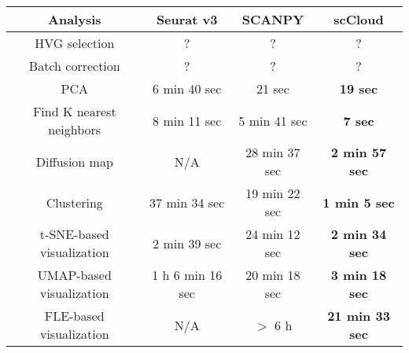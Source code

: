 \documentclass[10pt]{article}
\begin{document}
\begin{table}[H]
	\centering
	\begin{tabular}{|c|c|c|c|}
		\hline
		Analysis & Seurat v3 & SCANPY & scCloud\\
		\hline \hline
		HVG selection & ? & ? & ? \\
		\hline
		Batch correction & ? & ? & ? \\
		\hline
		PCA & 6 min 40 sec & 21 sec & \textbf{19 sec} \\
		\hline
		Find K nearest neighbors & 8 min 11 sec &  5 min 41 sec & \textbf{7 sec}\\
		\hline
		Diffusion map & N/A & 28 min 37 sec & \textbf{2 min 57 sec} \\
		\hline 
		Clustering & 37 min 34 sec & 19 min 22 sec & \textbf{1 min 5 sec}\\
		\hline
		t-SNE-based visualization & 2 min 39 sec & 24 min 12 sec & \textbf{2 min 34 sec}\\
		\hline
		UMAP-based visualization & 1 h 6 min 16 sec & 20 min 18 sec & \textbf{3 min 18 sec}\\
		\hline
		FLE-based visualization & N/A & $>$ 6 h & \textbf{21 min 33 sec}\\
		\hline
	\end{tabular}
\end{table}
\end{document}

